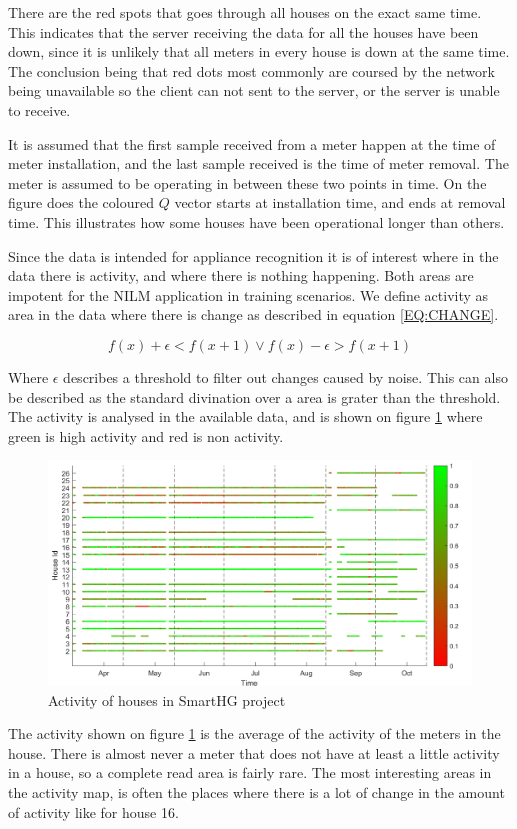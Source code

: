 There are the red spots that goes through all houses on the exact same time. This indicates that the server receiving the data for all the houses have been down, since it is unlikely that all meters in every house is down at the same time. The conclusion being that red dots most commonly are coursed by the network being unavailable so the client can not sent to the server, or the server is unable to receive. 

It is assumed that the first sample received from a meter happen at the time of meter installation, and the last sample received is the time of meter removal. The meter is assumed to be operating in between these two points in time. On the figure does the coloured $Q$ vector starts at installation time, and ends at removal time. This illustrates how some houses have been operational longer than others. 

Since the data is intended for appliance recognition it is of interest where in the data there is activity, and where there is nothing happening. Both areas are impotent for the NILM application in training scenarios. We define activity as area in the data where there is change as described in equation \ref{EQ:CHANGE}.

\begin{equation}
f(x) + \epsilon < f(x+1) \vee f(x) - \epsilon > f(x+1)
\label{EQ:CHANGE}
\end{equation}

Where $\epsilon$ describes a threshold to filter out changes caused by noise. This can also be described as the standard divination over a area is grater than the threshold. The activity is analysed in the available data, and is shown on figure \ref{fig:ActivityMap} where green is high activity and red is non activity. 

\begin{figure}[H]
\centering
\includegraphics[width=1\textwidth]{billeder/ActivityBig.png}
\caption{Activity of houses in SmartHG project}
\label{fig:ActivityMap}
\end{figure}

The activity shown on figure \ref{fig:ActivityMap} is the average of the activity of the meters in the house. There is almost never a meter that does not have at least a little activity in a house, so a complete read area is fairly rare. The most interesting areas in the activity map, is often the places where there is a lot of change in the amount of activity like for house 16.

